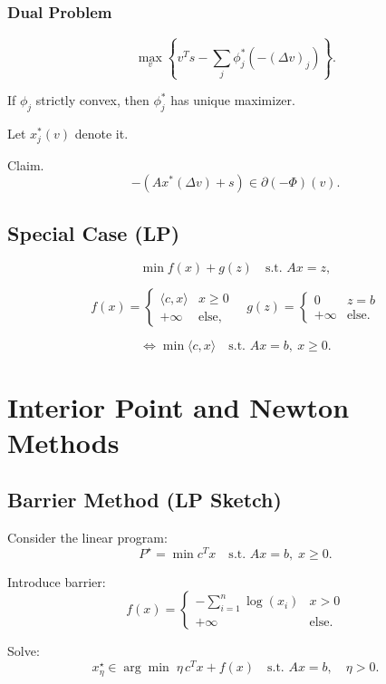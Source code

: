 \documentclass[12pt,oneside]{book}
\numberwithin{equation}{section}
\theoremstyle{definition}
\theoremstyle{plain}
\theoremstyle{remark}
\begin{document}
\subsubsection*{Dual Problem}

\[
\max_v \left\{ v^T s - \sum_j \phi_j^*(-(\Delta v)_j) \right\}.
\]

If $\phi_j$ strictly convex, then $\phi_j^*$ has unique maximizer.

Let $x_j^*(v)$ denote it.

Claim. \\

\[
-(Ax^*(\Delta v) + s) \in \partial(-\Phi)(v).
\]

\subsection{Special Case (LP)}

\[
\min f(x) + g(z)
\quad \text{s.t. } Ax = z,
\]

\[
f(x) =
\begin{cases}
\langle c,x\rangle & x \ge 0 \\
+\infty & \text{else},
\end{cases}
\quad
g(z) =
\begin{cases}
0 & z = b \\
+\infty & \text{else}.
\end{cases}
\]

\[
\Longleftrightarrow
\min \langle c,x\rangle
\quad \text{s.t. } Ax = b, \ x \ge 0.
\]

\section{Interior Point and Newton Methods}

\subsection{Barrier Method (LP Sketch)}

Consider the linear program:
\[
P^\star =
\min c^T x
\quad \text{s.t. } Ax = b,\; x \ge 0.
\]

Introduce barrier:
\[
f(x) =
\begin{cases}
-\sum_{i=1}^n \log(x_i) & x > 0 \\
+\infty & \text{else}.
\end{cases}
\]

Solve:
\[
x_\eta^\star \in
\arg\min \; \eta \, c^T x + f(x)
\quad \text{s.t. } Ax = b,
\quad \eta > 0.
\]
\end{document}
